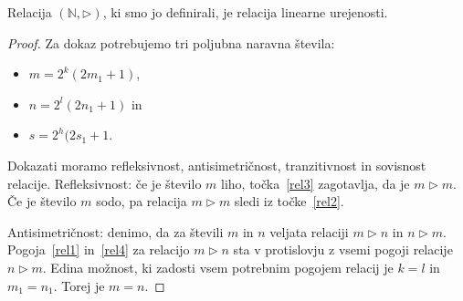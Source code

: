 \documentclass[mat2]{fmfdelo}
\newcommand{\N}{\mathbb N}
\begin{document}
\begin{trditev}
Relacija $(\N, \triangleright)$, ki smo jo definirali, je relacija linearne urejenosti.
\end{trditev}
\begin{proof}
Za dokaz potrebujemo tri poljubna naravna števila:
\begin{itemize}
\item $m= 2^k(2m_1 +1)$,
\item $n= 2^l(2n_1 +1)$ in
\item $s=2^h(2s_1+1$.
\end{itemize}
Dokazati moramo refleksivnost, antisimetričnost, tranzitivnost in sovisnost relacije.
Refleksivnost: če je število $m$ liho, točka~\ref{rel3} zagotavlja, da je $m \triangleright m$. Če je število $m$ sodo, pa relacija $m \triangleright m$ sledi iz točke~\ref{rel2}.

Antisimetričnost: denimo, da za števili $m$ in $n$ veljata relaciji $m \triangleright n$ in $n \triangleright m$. Pogoja~\ref{rel1} in~\ref{rel4} za relacijo $m \triangleright n$ sta v protislovju z vsemi pogoji relacije $n \triangleright m$. Edina možnost, ki zadosti vsem potrebnim pogojem relacij je $k=l$ in $m_1 = n_1$. Torej je $m=n$.


\end{proof}
\end{document}
